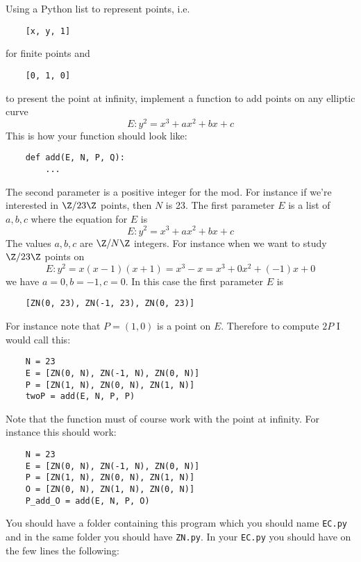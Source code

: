 \documentclass[a4paper,12pt]{article}
\begin{document}
Using a Python list to represent points, i.e.
\begin{Verbatim}
    [x, y, 1]
\end{Verbatim}
for finite points and 
\begin{Verbatim}
    [0, 1, 0]
\end{Verbatim}
to present the point at infinity, implement a function to add points
on any elliptic curve 
\[
E: y^2 = x^3 + ax^2 + bx + c
\]
This is how your function should look like:
\begin{Verbatim}
    def add(E, N, P, Q):
        ...
\end{Verbatim}
The second parameter is a positive integer for the mod. 
For instance if we're interested in $\Z/23\Z$ points, then $N$ is 23.
The first parameter $E$ is a list of $a, b, c$ where the equation for 
$E$ is
\[
E: y^2 = x^3 + ax^2 + bx + c
\]
The values $a,b,c$ are $\Z/N\Z$ integers.
For instance when we want to study $\Z/23\Z$ points on 
\[
E: y^2 = x(x-1)(x+1) = x^3 - x = x^3 + 0x^2 + (-1)x + 0
\]
we have $a = 0, b = -1, c = 0$.
In this case the first parameter $E$ is
\begin{Verbatim}
    [ZN(0, 23), ZN(-1, 23), ZN(0, 23)]
\end{Verbatim}
For instance note that $P = (1,0)$ is a point on $E$.
Therefore to compute $2P$ I would call this:
\begin{Verbatim}
    N = 23
    E = [ZN(0, N), ZN(-1, N), ZN(0, N)]
    P = [ZN(1, N), ZN(0, N), ZN(1, N)]
    twoP = add(E, N, P, P)
\end{Verbatim}
Note that the function must of course work with the point at infinity.
For instance this should work:
\begin{Verbatim}
    N = 23
    E = [ZN(0, N), ZN(-1, N), ZN(0, N)]
    P = [ZN(1, N), ZN(0, N), ZN(1, N)]
    O = [ZN(0, N), ZN(1, N), ZN(0, N)]
    P_add_O = add(E, N, P, O)
\end{Verbatim}

You should have a folder containing this program which you should name
\verb!EC.py! and in the same folder you should have \verb!ZN.py!.
In your \verb!EC.py! you should have on the few lines the following:
\end{document}
